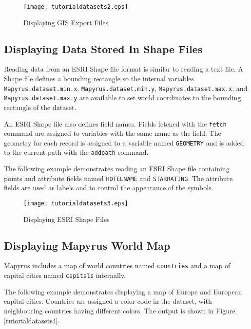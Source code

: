 

\begin{figure}[htb]
\texttt{[image: tutorialdatasets2.eps]}
\caption{Displaying GIS Export Files}
\label{tutorialdatasets2}
\end{figure}

\subsection{Displaying Data Stored In Shape Files}

Reading data from an ESRI Shape file format is similar to reading a text file.
A Shape file defines a bounding rectangle so the internal variables
\texttt{Mapyrus.dataset.min.x}, \texttt{Mapyrus.dataset.min.y},
\texttt{Mapyrus.dataset.max.x}, and \texttt{Mapyrus.dataset.max.y} are
available to set world coordinates to the bounding rectangle of the dataset.

An ESRI Shape file also defines field names.  Fields fetched with the
\texttt{fetch} command are assigned to variables with the same name as the
field.  The geometry for each record is assigned to a variable named
\texttt{GEOMETRY} and is added to the current path with the \texttt{addpath}
command.

The following example demonstrates reading an ESRI Shape file containing points
and attribute fields named \texttt{HOTELNAME} and \texttt{STARRATING}.  The
attribute fields are used as labels and to control the appearance of the
symbols.



\begin{figure}[htb]
\texttt{[image: tutorialdatasets3.eps]}
\caption{Displaying ESRI Shape Files}
\label{tutorialdatasets3}
\end{figure}

\subsection{Displaying Mapyrus World Map}

Mapyrus includes a map of world countries named \texttt{countries}
and a map of capital cities named \texttt{capitals} internally.

The following example demonstrates displaying a map of Europe
and European capital cities.  Countries are assigned a color code
in the dataset, with neighbouring countries having different colors.
The output is shown in Figure \ref{tutorialdatasets4}.

